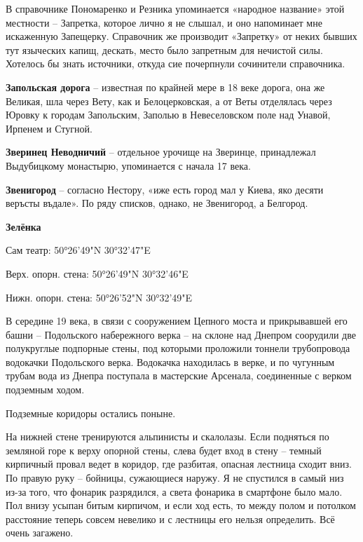 В справочнике Пономаренко и Резника упоминается «народное название» этой местности – Запретка, которое лично я не слышал, и оно напоминает мне искаженную Запещерку. Справочник же производит «Запретку» от неких бывших тут языческих капищ, дескать, место было запретным для нечистой силы. Хотелось бы знать источники, откуда сие почерпнули сочинители справочника.\\

\medskip

\textbf{Запольская дорога} – известная по крайней мере в 18 веке дорога, она же Великая, шла через Вету, как и Белоцерковская, а от Веты отделялась через Юровку к городам Запольским, Заполью в Невеселовском поле над Унавой, Ирпенем и Стугной.\\

\medskip

\textbf{Зверинец Неводничий} – отдельное урочище на Зверинце, принадлежал Выдубицкому монастырю, упоминается с начала 17 века.\\

\medskip

\textbf{Звенигород} – согласно Нестору, «иже есть город мал у Киева, яко десяти веръсты въдале». По ряду списков, однако, не Звенигород, а Белгород.\\

\newpage

\textbf{Зелёнка}

Сам театр: 50°26'49"N 30°32'47"E

Верх. опорн. стена: 50°26'49"N 30°32'46"E

Нижн. опорн. стена: 50°26'52"N 30°32'49"E

В середине 19 века, в связи с сооружением Цепного моста и прикрывавшей его башни – Подольского набережного верка – на склоне над Днепром соорудили две полукруглые подпорные стены, под которыми проложили тоннели трубопровода водокачки Подольского верка. Водокачка находилась в верке, и по чугунным трубам вода из Днепра поступала в мастерские Арсенала, соединенные с верком подземным ходом. 

Подземные коридоры остались поныне. 

На нижней стене тренируются альпинисты и скалолазы. Если подняться по земляной горе к верху опорной стены, слева будет вход в стену – темный кирпичный провал ведет в коридор, где разбитая, опасная лестница сходит вниз. По правую руку – бойницы, сужающиеся наружу. Я не спустился в самый низ из-за того, что фонарик разрядился, а света фонарика в смартфоне было мало. Пол внизу усыпан битым кирпичом, и если ход есть, то между полом и потолком расстояние теперь совсем невелико и с лестницы его нельзя определить. Всё очень загажено. 

